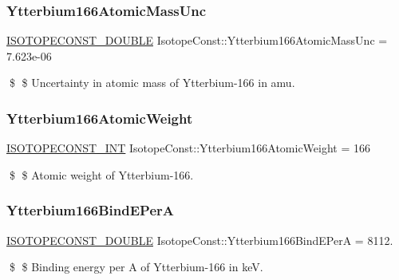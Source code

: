 \subsubsection{\texorpdfstring{Ytterbium166\+Atomic\+Mass\+Unc}{Ytterbium166AtomicMassUnc}}
{\footnotesize\ttfamily \mbox{\hyperlink{group___isotope_const-_macros_ga8f45a7272ce02c0b4c65c44636ed719a}{I\+S\+O\+T\+O\+P\+E\+C\+O\+N\+S\+T\+\_\+\+D\+O\+U\+B\+LE}} Isotope\+Const\+::\+Ytterbium166\+Atomic\+Mass\+Unc = 7.\+623e-\/06}

\$ \$ Uncertainty in atomic mass of Ytterbium-\/166 in amu. \mbox{\label{group___isotope_const-_ytterbium-_yb166_gabec2b76d2718c7a7ac7460fa065054ed}} 
\subsubsection{\texorpdfstring{Ytterbium166\+Atomic\+Weight}{Ytterbium166AtomicWeight}}
{\footnotesize\ttfamily \mbox{\hyperlink{group___isotope_const-_macros_ga5f18360b3e99483a35c32d789e62621c}{I\+S\+O\+T\+O\+P\+E\+C\+O\+N\+S\+T\+\_\+\+I\+NT}} Isotope\+Const\+::\+Ytterbium166\+Atomic\+Weight = 166}

\$ \$ Atomic weight of Ytterbium-\/166. \mbox{\label{group___isotope_const-_ytterbium-_yb166_ga4c6aac47cd1991acbf63332142165d43}} 
\subsubsection{\texorpdfstring{Ytterbium166\+Bind\+E\+PerA}{Ytterbium166BindEPerA}}
{\footnotesize\ttfamily \mbox{\hyperlink{group___isotope_const-_macros_ga8f45a7272ce02c0b4c65c44636ed719a}{I\+S\+O\+T\+O\+P\+E\+C\+O\+N\+S\+T\+\_\+\+D\+O\+U\+B\+LE}} Isotope\+Const\+::\+Ytterbium166\+Bind\+E\+PerA = 8112.}

\$ \$ Binding energy per A of Ytterbium-\/166 in keV. \mbox{\label{group___isotope_const-_ytterbium-_yb166_ga8a90191565707d49c4b043ca4af6f466}} 
